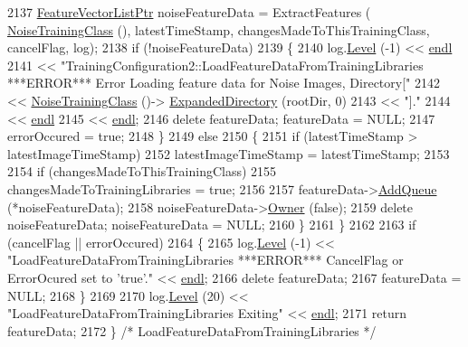 \begin{DoxyCode}
2137     \hyperlink{class_k_k_m_l_l_1_1_feature_vector_list}{FeatureVectorListPtr}  noiseFeatureData = ExtractFeatures (
      \hyperlink{class_k_k_m_l_l_1_1_training_configuration2_a3fae0dc2f5f2b875c64992f16cef09e1}{NoiseTrainingClass} (), latestTimeStamp, changesMadeToThisTrainingClass, cancelFlag, log);
2138     \textcolor{keywordflow}{if}  (!noiseFeatureData)
2139     \{
2140       log.\hyperlink{class_k_k_b_1_1_run_log_a32cf761d7f2e747465fd80533fdbb659}{Level} (-1) << \hyperlink{namespace_k_k_b_ad1f50f65af6adc8fa9e6f62d007818a8}{endl}
2141                      << \textcolor{stringliteral}{"TrainingConfiguration2::LoadFeatureDataFromTrainingLibraries   ***ERROR***  Error
       Loading feature data for Noise Images, Directory["} 
2142                      << \hyperlink{class_k_k_m_l_l_1_1_training_configuration2_a3fae0dc2f5f2b875c64992f16cef09e1}{NoiseTrainingClass} ()->
      \hyperlink{class_k_k_m_l_l_1_1_training_class_ace6d7708b3809e1183a9f6c86b2ee432}{ExpandedDirectory} (rootDir, 0) 
2143                      << \textcolor{stringliteral}{"]."} 
2144                      << \hyperlink{namespace_k_k_b_ad1f50f65af6adc8fa9e6f62d007818a8}{endl}
2145                      << \hyperlink{namespace_k_k_b_ad1f50f65af6adc8fa9e6f62d007818a8}{endl};
2146       \textcolor{keyword}{delete}  featureData;  featureData = NULL;
2147       errorOccured = \textcolor{keyword}{true};
2148     \}
2149     \textcolor{keywordflow}{else}
2150     \{
2151       \textcolor{keywordflow}{if}  (latestTimeStamp > latestImageTimeStamp)
2152         latestImageTimeStamp = latestTimeStamp;
2153 
2154       \textcolor{keywordflow}{if}  (changesMadeToThisTrainingClass)
2155         changesMadeToTrainingLibraries = \textcolor{keyword}{true};
2156 
2157       featureData->\hyperlink{class_k_k_m_l_l_1_1_feature_vector_list_a90809e07f7e33e591da0d266c1907ca9}{AddQueue} (*noiseFeatureData);
2158       noiseFeatureData->\hyperlink{class_k_k_b_1_1_k_k_queue_a4990d037ff09dd504cc7df53819bf61a}{Owner} (\textcolor{keyword}{false});
2159       \textcolor{keyword}{delete}  noiseFeatureData;  noiseFeatureData = NULL;
2160     \}
2161   \}
2162 
2163   \textcolor{keywordflow}{if}  (cancelFlag  ||  errorOccured)
2164   \{
2165     log.\hyperlink{class_k_k_b_1_1_run_log_a32cf761d7f2e747465fd80533fdbb659}{Level} (-1) << \textcolor{stringliteral}{"LoadFeatureDataFromTrainingLibraries     ***ERROR***    CancelFlag or
       ErrorOcured  set to 'true'."} << \hyperlink{namespace_k_k_b_ad1f50f65af6adc8fa9e6f62d007818a8}{endl};
2166     \textcolor{keyword}{delete}  featureData;  
2167     featureData = NULL;
2168   \}
2169 
2170   log.\hyperlink{class_k_k_b_1_1_run_log_a32cf761d7f2e747465fd80533fdbb659}{Level} (20) << \textcolor{stringliteral}{"LoadFeatureDataFromTrainingLibraries   Exiting"} << 
      \hyperlink{namespace_k_k_b_ad1f50f65af6adc8fa9e6f62d007818a8}{endl};
2171   \textcolor{keywordflow}{return}  featureData;
2172 \}  \textcolor{comment}{/*  LoadFeatureDataFromTrainingLibraries */}
\end{DoxyCode}
